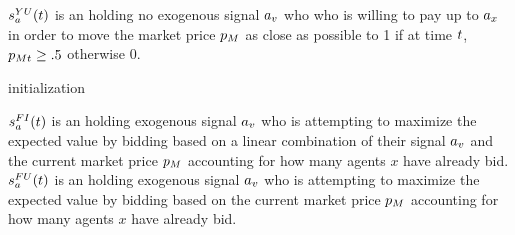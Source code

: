 $s^{YU}_a(t)$ is an  holding no exogenous signal $a_v$ who who is willing to pay up to $a_x$ in order to move the market price $p_M$ as close as possible to 1 if at time $t$, $p_{Mt} \ge .5$ otherwise 0. \\

\begin{algorithm}[H]
\SetAlgoLined
{}
initialization\;
\end{algorithm}

$s^{FI}_a(t)$ is an holding exogenous signal $a_v$ who is attempting to maximize the expected value by bidding based on a linear combination of their signal $a_v$ and the current market price $p_M$ accounting for how many agents $x$ have already bid. \\

$s^{FU}_a(t)$ is an  holding exogenous signal $a_v$ who is attempting to maximize the expected value by bidding based on the current market price $p_M$ accounting for how many agents $x$ have already bid. \\
